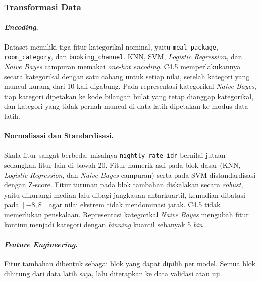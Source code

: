 \subsubsection{Transformasi Data}

\paragraph{\textit{Encoding}.} Dataset memiliki tiga fitur kategorikal nominal,
yaitu \texttt{meal\_package}, \texttt{room\_category}, dan
\texttt{booking\_channel}. KNN, SVM, \textit{Logistic Regression}, dan
\textit{Naive Bayes} campuran memakai \textit{one-hot encoding}. C4.5 memperlakukannya secara kategorikal dengan
satu cabang untuk setiap nilai, setelah kategori yang muncul kurang dari 10
kali digabung. Pada representasi kategorikal \textit{Naive Bayes}, tiap
kategori dipetakan ke kode bilangan bulat yang tetap dianggap kategorikal,
dan kategori yang tidak pernah muncul di data latih dipetakan ke modus data
latih.

\paragraph{Normalisasi dan Standardisasi.} Skala fitur sangat berbeda, misalnya
\texttt{nightly\_\allowbreak rate\_idr} bernilai jutaan sedangkan fitur lain di
bawah 20. Fitur numerik asli pada blok dasar (KNN, \textit{Logistic
Regression}, dan \textit{Naive Bayes} campuran) serta pada SVM distandardisasi
dengan Z-score. Fitur turunan pada blok tambahan diskalakan secara
\textit{robust}, yaitu dikurangi median lalu dibagi jangkauan antarkuartil,
kemudian dibatasi pada $[-8,8]$ agar nilai ekstrem tidak mendominasi jarak.
C4.5 tidak memerlukan penskalaan. Representasi kategorikal \textit{Naive
Bayes} mengubah fitur kontinu menjadi kategori dengan \textit{binning}
kuantil sebanyak 5 \textit{bin} \cite{ref:materi-09, ref:dougherty-1995}.

\paragraph{\textit{Feature Engineering}.}\label{sec:fitur-tambahan} Fitur
tambahan dibentuk sebagai blok yang dapat dipilih per model. Semua blok
dihitung dari data latih saja, lalu diterapkan ke data validasi atau uji.

